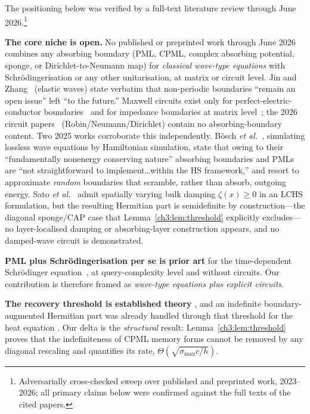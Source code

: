 The positioning below was verified by a full-text literature review
through June 2026.\footnote{Adversarially cross-checked sweep over
published and preprinted work, 2023--2026; all primary claims below were
confirmed against the full texts of the cited papers.}

\noindent\textbf{The core niche is open.}  No published or preprinted work
through June 2026 combines any absorbing boundary (PML, CPML, complex
absorbing potential, sponge, or Dirichlet-to-Neumann map) for
\emph{classical wave-type equations} with Schr\"odingerisation or any
other unitarisation, at matrix or circuit level.  Jin and
Zhang~\cite{jin2025elastic} (elastic waves) state verbatim that
non-periodic boundaries ``remain an open issue'' left ``to the future.''
Maxwell circuits exist only for perfect-electric-conductor
boundaries~\cite{ma2024maxwellcircuits} and for impedance boundaries at
matrix level~\cite{jin2023maxwell}; the 2026 circuit
papers~\cite{liang2026structure,guseynov2026robin}
(Robin/Neumann/Dirichlet) contain no absorbing-boundary content.
Two 2025 works corroborate this independently.  B\"osch \emph{et
al.}~\cite{bosch2025sources}, simulating lossless wave equations by
Hamiltonian simulation, state that owing to their ``fundamentally
nonenergy conserving nature'' absorbing boundaries and PMLs are ``not
straightforward to implement\ldots within the HS framework,'' and resort
to approximate \emph{random} boundaries that scramble, rather than
absorb, outgoing energy.  Sato \emph{et
al.}~\cite{sato2025nonconservative} admit spatially varying bulk damping
$\zeta(x)\ge0$ in an LCHS formulation, but the resulting Hermitian part
is semidefinite by construction---the diagonal sponge/CAP case that
Lemma~\ref{ch3:lem:threshold} explicitly excludes---no layer-localised
damping or absorbing-layer construction appears, and no damped-wave
circuit is demonstrated.

\noindent\textbf{PML plus Schr\"odingerisation per se is prior art} for the
time-dependent Schr\"odinger equation~\cite{jin2024abc}, at
query-complexity level and without circuits.  Our contribution is
therefore framed as \emph{wave-type equations plus explicit circuits}.

\noindent\textbf{The recovery threshold is established theory}
\cite[Thm.~3.1]{jin2024recovery}, and an indefinite boundary-augmented
Hermitian part was already handled through that threshold for the heat
equation \cite[Remark~1]{jin2024heat}.  Our delta is the
\emph{structural} result: Lemma~\ref{ch3:lem:threshold} proves that the
indefiniteness of CPML memory forms cannot be removed by any diagonal
rescaling and quantifies its rate, $\Theta(\sqrt{\sigma_{\max}c/h})$.

